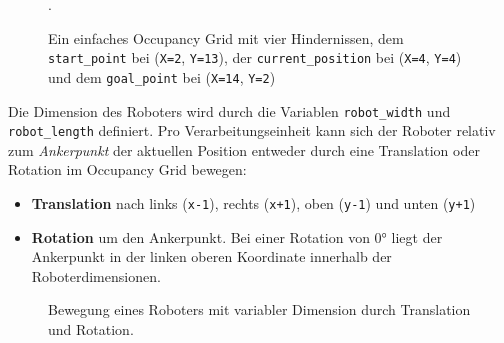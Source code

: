 \begin{figure}[H]
\begin{minipage}{0.35\textwidth}
	\end{minipage}
	\hspace*{\fill}
	\caption{Ein einfaches Occupancy Grid mit vier Hindernissen, dem \texttt{start\_point} bei (\texttt{X=2}, \texttt{Y=13}), der \texttt{current\_position} bei (\texttt{X=4}, \texttt{Y=4}) und dem \texttt{goal\_point} bei (\texttt{X=14}, \texttt{Y=2})}.
\end{figure}

\vspace*{-0.3cm}
Die Dimension des Roboters wird durch die Variablen \texttt{robot\_width} und \texttt{robot\_length} definiert. Pro Verarbeitungseinheit kann sich der Roboter relativ zum \textit{Ankerpunkt} der aktuellen Position entweder durch eine Translation oder Rotation im Occupancy Grid bewegen:
\begin{itemize}
\item \textbf{Translation} nach links (\texttt{x-1}), rechts (\texttt{x+1}), oben (\texttt{y-1}) und unten (\texttt{y+1})
\item \textbf{Rotation} um den Ankerpunkt. Bei einer Rotation von $0$° liegt der Ankerpunkt in der linken oberen Koordinate innerhalb der Roboterdimensionen.
\end{itemize}
\vspace*{0.3cm}
\begin{figure}[H]
	\centering
	\footnotesize
	\centerline{\resizebox{1\linewidth}{!}{}}
	\caption{Bewegung eines Roboters mit variabler Dimension durch Translation und Rotation.}
\end{figure}

